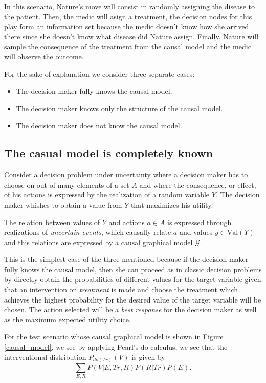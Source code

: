 \documentclass{article}
\begin{document}
In this scenario, Nature's move will consist in randomly assigning the disease to the patient. Then, the medic will asign a treatment, the decision nodes for this play form an information set because the medic doesn't know how she arrived there since she doesn't know what disease did Nature assign. Finally, Nature will sample the consequence of the treatment from the causal model and the medic will observe the outcome.

For the sake of explanation we consider three separate cases:
\begin{itemize}
\item The decision maker fully knows the causal model.
\item The decision maker knows only the structure of the causal model.
\item The decision maker does not know the causal model.
\end{itemize}

\subsection{The casual model is completely known}
Consider a decision problem under uncertainty where a decision maker has to choose on out of many elements of a set $A$ and where the consequence, or effect, of his actions is expressed by the realization of a random variable $Y$. The decision maker whishes to obtain a value from $Y$ that maximizes his utility. 

The relation between values of $Y$ and actions $a \in A$ is expressed through realizations of \textit{uncertain events}, which causally relate $a$ and values $y \in \textrm{Val}(Y)$ and this relations are expressed by a causal graphical model $\mathcal{G}$.

This is the simplest case of the three mentioned because if the decision maker fully knows the causal model, then she can proceed as in classic decision problems by directly obtain the probabilities of different values for the target variable given that an intervention on \textit{treatment} is made and choose the treatment which achieves the highest probability for the desired value of the target variable will be chosen. The action selected will be a \textit{best response} for the decision maker as well as the maximum expected utility choice.

For the test scenario whose causal graphical model is shown in Figure \ref{causal_model}, we see  by applying Pearl's \cite{pearl2009causality} do-calculus, we see that the interventional distribution $P_{do(Tr)}(V)$ is given by
\[ \sum_{E,R}P(V|E,Tr,R)P(R|Tr)P(E). \]
\end{document}
